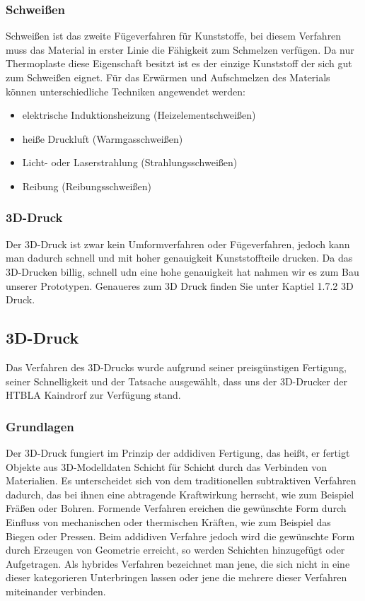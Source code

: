 \subsubsection{Schweißen}
Schweißen ist das zweite Fügeverfahren für Kunststoffe, bei diesem Verfahren muss das Material in erster Linie die
Fähigkeit zum Schmelzen verfügen. Da nur Thermoplaste diese Eigenschaft besitzt ist es der einzige Kunststoff der sich gut
zum Schweißen eignet. Für das Erwärmen und Aufschmelzen des Materials können unterschiedliche Techniken angewendet werden:
\begin{itemize}
    \item elektrische Induktionsheizung (Heizelementschweißen)
    \item heiße Druckluft (Warmgasschweißen)
    \item Licht- oder Laserstrahlung (Strahlungsschweißen)
    \item Reibung (Reibungsschweißen)
\end{itemize}

\subsubsection{3D-Druck}
Der 3D-Druck ist zwar kein Umformverfahren oder Fügeverfahren, jedoch kann man dadurch schnell und mit hoher genauigkeit Kunststoffteile
drucken. Da das 3D-Drucken billig, schnell udn eine hohe genauigkeit hat nahmen wir es zum Bau unserer Prototypen. Genaueres zum 3D Druck finden
Sie unter Kaptiel 1.7.2 3D Druck.

\subsection{3D-Druck}
Das Verfahren des 3D-Drucks wurde aufgrund seiner preisgünstigen Fertigung, seiner Schnelligkeit und der Tatsache
ausgewählt, dass uns der 3D-Drucker der HTBLA Kaindrorf zur Verfügung stand.
\subsubsection{Grundlagen}
Der 3D-Druck fungiert im Prinzip der addidiven Fertigung, das heißt, er fertigt Objekte aus 3D-Modelldaten Schicht für Schicht
durch das Verbinden von Materialien. Es unterscheidet sich von dem traditionellen subtraktiven Verfahren dadurch,
das bei ihnen eine abtragende Kraftwirkung herrscht, wie zum Beispiel Fräßen oder Bohren. Formende Verfahren
ereichen die gewünschte Form durch Einfluss von mechanischen oder thermischen Kräften, wie zum Beispiel das Biegen oder
Pressen. Beim addidiven Verfahre jedoch wird die gewünschte Form durch Erzeugen von Geometrie erreicht, so werden Schichten
hinzugefügt oder Aufgetragen. Als hybrides Verfahren bezeichnet man jene, die sich nicht in eine dieser kategorieren
Unterbringen lassen oder jene die mehrere dieser Verfahren miteinander verbinden.

